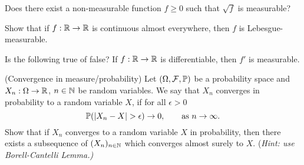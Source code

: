 \begin{problem}
    Does there exist a non-measurable function $f \geq 0$ such that
    $\sqrt{f}$ is measurable?
\end{problem}

\begin{problem}
    Show that if $f:\mathbb R\to \mathbb R$ is continuous almost everywhere, then $f$ is Lebesgue-measurable.
\end{problem}

\begin{problem}
    Is the following true of false?
    If $f : \mathbb R \to \mathbb R$ is differentiable, then $f'$ is measurable.
\end{problem}

\begin{problem}(Convergence in measure/probability) Let $(\Omega,\mathcal F,\mathbb P)$ be a probability space and $X_n:\Omega \to \mathbb R$, $n\in \mathbb N$ be random variables. We say that $X_n$ converges in probability to a random variable $X$, if for all $\epsilon>0$
    \begin{equation*}
        \bbP(|X_n-X|>\epsilon) \to 0,\qquad\text{as $n\to \infty$}.
    \end{equation*}  
Show that if $X_n$ converges to a random variable $X$ in probability, then there exists a subsequence of $(X_n)_{n\in \mathbb N}$ which converges almost surely to $X$. (\emph{Hint: use Borell-Cantelli Lemma.)}
\end{problem}
